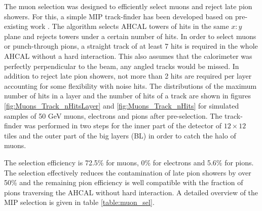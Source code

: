 The muon selection was designed to efficiently select muons and reject late pion showers. For this, a simple MIP track-finder has been developed based on pre-existing work \cite{Hartbrich:2016bbz}. The algorithm selects AHCAL towers of hits in the same $x:y$ plane and rejects towers under a certain number of hits. In order to select muons or punch-through pions, a straight track of at least 7 hits is required in the whole AHCAL without a hard interaction. This also assumes that the calorimeter was perfectly perpendicular to the beam, any angled tracks would be missed. In addition to reject late pion showers, not more than 2 hits are required per layer accounting for some flexibility with noise hits. The distributions of the maximum number of hits in a layer and the number of hits of a track are shown in figures \ref{fig:Muons_Track_nHitsLayer} and \ref{fig:Muons_Track_nHits} for simulated samples of 50 GeV muons, electrons and pions after pre-selection. The track-finder was performed in two steps for the inner part of the detector of $12 \times 12$ tiles and the outer part of the big layers (BL) in order to catch the halo of muons.

The selection efficiency is 72.5\% for muons, 0\% for electrons and 5.6\% for pions. The selection effectively reduces the contamination of late pion showers by over 50\% and the remaining pion efficiency is well compatible with the fraction of pions traversing the AHCAL without hard interaction. A detailed overview of the MIP selection is given in table \ref{table:muon_sel}.

